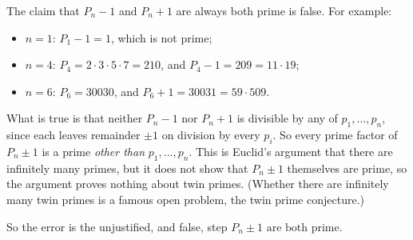 The claim that $P_n-1$ and $P_n+1$ are always both prime is false. For example:
\begin{itemize}
\item $n=1$: $P_1-1=1$, which is not prime;
\item $n=4$: $P_4=2\cdot3\cdot5\cdot7=210$, and $P_4-1=209=11\cdot19$;
\item $n=6$: $P_6=30030$, and $P_6+1=30031=59\cdot509$.
\end{itemize}
What is true is that neither $P_n-1$ nor $P_n+1$ is divisible by any of $p_1,\dots,p_n$, since each leaves remainder $\pm1$ on division by every $p_i$. So every prime factor of $P_n\pm1$ is a prime \emph{other than} $p_1,\dots,p_n$. This is Euclid's argument that there are infinitely many primes, but it does not show that $P_n\pm1$ themselves are prime, so the argument proves nothing about twin primes. (Whether there are infinitely many twin primes is a famous open problem, the twin prime conjecture.)

So the error is the unjustified, and false, step $\boxed{P_n\pm1\text{ are both prime}}$.
